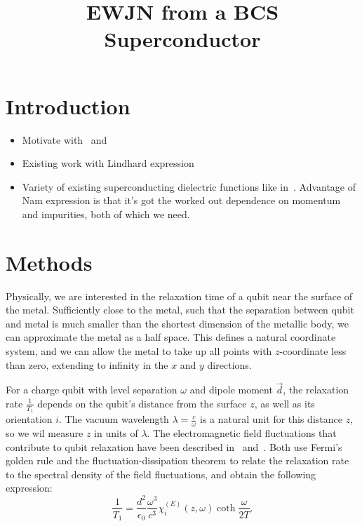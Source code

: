 \documentclass{article}
\title{EWJN from a BCS Superconductor}
\begin{document}
\maketitle

\section{Introduction \label{sec:intro}}
\begin{itemize}
	\item Motivate with~\cite{Tenberg2019} and~\cite{Kolkowitz2015}
	\item Existing work with Lindhard expression~\cite{QubitRelax}
	\item Variety of existing superconducting dielectric functions like in~\cite{AGD, llv9, Zimmermann1991, Mattis, Tinkham}.
	Advantage of Nam expression\cite{Nam1967} is that it's got the worked out dependence on momentum and impurities, both of which we need.
\end{itemize}
\section{Methods \label{sec:methods}}

Physically, we are interested in the relaxation time of a qubit near the surface of the metal.
Sufficiently close to the metal, such that the separation between qubit and metal is much smaller than the shortest dimension of the metallic body, we can approximate the metal as a half space.
This defines a natural coordinate system, and we can allow the metal to take up all points with $z$-coordinate less than zero, extending to infinity in the $x$ and $y$ directions.

For a charge qubit with level separation $\omega$ and dipole moment $\vec{d}$, the relaxation rate $\frac{1}{T_1}$ depends on the qubit's distance from the surface $z$, as well as its orientation $i$.
The vacuum wavelength $\lambda = \frac{c}{\omega}$ is a natural unit for this distance $z$, so we wil measure $z$ in units of $\lambda$.
The electromagnetic field fluctuations that contribute to qubit relaxation have been described in~\cite{QubitRelax} and~\cite{Henkel1999}.
Both use Fermi's golden rule and the fluctuation-dissipation theorem to relate the relaxation rate to the spectral density of the field fluctuations, and obtain the following expression:
\begin{equation}
	\frac{1}{T_1} = \frac{d^2}{\epsilon_0} \frac{\omega^3}{c^3} \chi_{i}^{(E)}(z, \omega) \coth\frac{\omega}{2 T}.
\end{equation}
\end{document}
